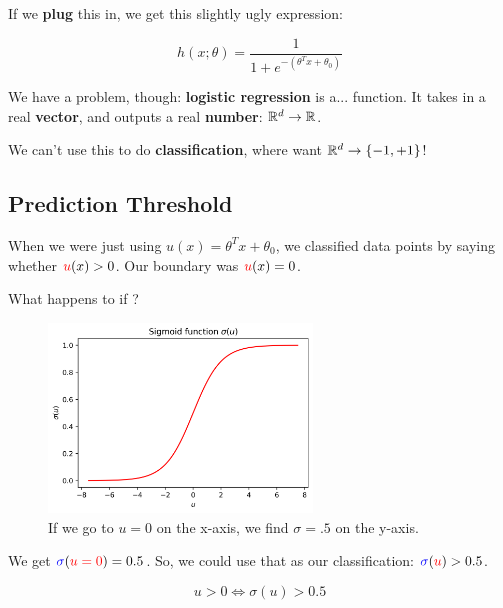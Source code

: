        If we \textbf{plug} this in, we get this slightly ugly expression:
        
        \begin{equation*}
            h(x; \theta) = \frac{1}{1+e^{-(\theta^T x + \theta_0) } }
        \end{equation*}
        
        We have a problem, though: \textbf{logistic regression} is a...  function. It takes in a real \textbf{vector}, and outputs a real \textbf{number}: $\mathbb R^d \rightarrow \mathbb R$.
        
        We can't use this to do \textbf{classification}, where want $\mathbb R^d \rightarrow \{-1,+1\}$!
        
    \subsection{Prediction Threshold}
    
        When we were just using $u(x) = \theta^T x + \theta_0$, we classified data points by saying whether $\textcolor{red}{u}(x)>0$. Our boundary was $\textcolor{red}{u}(x)=0$.
        
        What happens to \blu{$\sigma$} if ?
        
        \begin{figure}[H]
            \centering
            
            \includegraphics[width=70mm,scale=0.5]{images/classification_images/sigmoid_u.png}
            
            \caption*{If we go to $u=0$ on the x-axis, we find $\sigma=.5$ on the y-axis.}
        \end{figure}
        
        We get $\textcolor{blue}{\sigma}(\textcolor{red}{u=0})=0.5$. So, we could use that as our classification: $\textcolor{blue}{\sigma}(\textcolor{red}{u})>0.5$.

        \begin{equation}
            u>0 \iff \sigma(u) > 0.5
        \end{equation}

